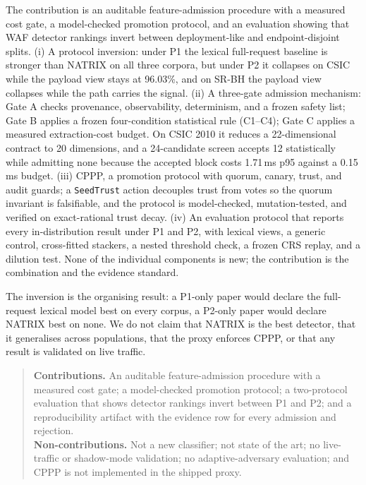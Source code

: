 \documentclass[conference]{IEEEtran}
\newcommand{\feat}[1]{\texttt{#1}}
\begin{document}
The contribution is an auditable feature-admission procedure with a measured cost gate, a model-checked promotion protocol, and an evaluation showing that WAF detector rankings invert between deployment-like and endpoint-disjoint splits. (i) A protocol inversion: under P1 the lexical full-request baseline is stronger than NATRIX on all three corpora, but under P2 it collapses on CSIC while the payload view stays at 96.03\%, and on SR-BH the payload view collapses while the path carries the signal. (ii) A three-gate admission mechanism: Gate A checks provenance, observability, determinism, and a frozen safety list; Gate B applies a frozen four-condition statistical rule (C1--C4); Gate C applies a measured extraction-cost budget. On CSIC 2010 it reduces a 22-dimensional contract to 20 dimensions, and a 24-candidate screen accepts 12 statistically while admitting none because the accepted block costs 1.71\,ms p95 against a 0.15\,ms budget. (iii) CPPP, a promotion protocol with quorum, canary, trust, and audit guards; a \feat{SeedTrust} action decouples trust from votes so the quorum invariant is falsifiable, and the protocol is model-checked, mutation-tested, and verified on exact-rational trust decay. (iv) An evaluation protocol that reports every in-distribution result under P1 and P2, with lexical views, a generic control, cross-fitted stackers, a nested threshold check, a frozen CRS replay, and a dilution test. None of the individual components is new; the contribution is the combination and the evidence standard.

The inversion is the organising result: a P1-only paper would declare the full-request lexical model best on every corpus, a P2-only paper would declare NATRIX best on none. We do not claim that NATRIX is the best detector, that it generalises across populations, that the proxy enforces CPPP, or that any result is validated on live traffic.

\begin{quote}
\small
\textbf{Contributions.} An auditable feature-admission procedure with a measured cost gate; a model-checked promotion protocol; a two-protocol evaluation that shows detector rankings invert between P1 and P2; and a reproducibility artifact with the evidence row for every admission and rejection.\\[2pt]
\textbf{Non-contributions.} Not a new classifier; not state of the art; no live-traffic or shadow-mode validation; no adaptive-adversary evaluation; and CPPP is not implemented in the shipped proxy.
\end{quote}
\end{document}
